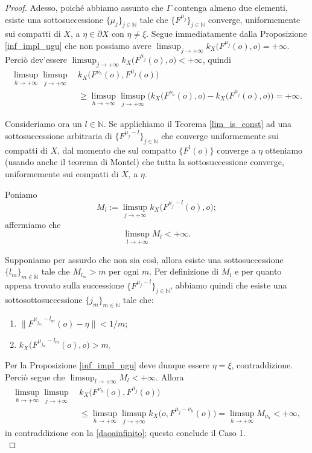 \begin{proof}
    Adesso, poiché abbiamo assunto che $\Gamma$ contenga almeno due elementi, esiste una sottosuccessione $\{\mu_j\}_{j\in\mathbb{N}}$ tale che $\{F^{\mu_j}\}_{j\in\mathbb{N}}$ converge, uniformemente sui compatti di $X$, a $\eta\in\partial X$ con $\eta\not=\xi$. Segue immediatamente dalla Proposizione \ref{inf_impl_ugu} che non possiamo avere $\displaystyle\limsup_{j\longrightarrow+\infty} k_X\big(F^{\mu_j}(o),o\big)=+\infty$. Perciò dev'essere $\displaystyle\limsup_{j\longrightarrow+\infty} k_X\big(F^{\mu_j}(o),o\big)<+\infty$, quindi
    \begin{equation} \label{daoainfinito}
        \begin{aligned}
            \limsup_{h\longrightarrow+\infty}\limsup_{j\longrightarrow+\infty}\, &k_X\big(F^{\nu_h}(o),F^{\mu_j}(o)\big) \\
            &\ge \limsup_{h\longrightarrow+\infty}\limsup_{j\longrightarrow+\infty} \Big(k_X\big(F^{\nu_h}(o),o\big)-k_X\big(F^{\mu_j}(o),o\big)\Big)=+\infty.
        \end{aligned}
    \end{equation}

    Consideriamo ora un $l\in\mathbb{N}$. Se applichiamo il Teorema \ref{lim_is_const} ad una sottosuccessione arbitraria di $\{F^{\mu_j-l}\}_{j\in\mathbb{N}}$ che converge uniformemente sui compatti di $X$, dal momento che sul compatto $\{F^l(o)\}$ converge a $\eta$ otteniamo (usando anche il teorema di Montel) che tutta la sottosuccessione converge, uniformemente sui compatti di $X$, a $\eta$.

    Poniamo
    $$M_l:=\limsup_{j\longrightarrow+\infty}k_X\big(F^{\mu_j-l}(o),o\big);$$
    affermiamo che
    $$\limsup_{l\longrightarrow+\infty}M_l<+\infty.$$

    Supponiamo per assurdo che non sia così, allora esiste una sottosuccessione $\{l_m\}_{m\in\mathbb{N}}$ tale che $M_{l_m}>m$ per ogni $m$. Per definizione di $M_l$ e per quanto appena trovato sulla successione $\{F^{\mu_j-l}\}_{j\in\mathbb{N}}$, abbiamo quindi che esiste una sottosottosuccessione $\{j_m\}_{m\in\mathbb{N}}$ tale che:
    \begin{enumerate}[label={(\arabic*)}]
        \item $\|F^{\mu_{j_m}-l_m}(o)-\eta\|<1/m$;
        \item $k_X\big(F^{\mu_{j_m}-l_m}(o),o\big)>m$.
    \end{enumerate}

    Per la Proposizione \ref{inf_impl_ugu} deve dunque essere $\eta=\xi$, contraddizione. Perciò segue che $\displaystyle\limsup_{l\longrightarrow+\infty}M_l<+\infty$. Allora
    \begin{align*}
        \limsup_{h\longrightarrow+\infty}\limsup_{j\longrightarrow+\infty}\, &k_X\big(F^{\nu_h}(o),F^{\mu_j}(o)\big) \\
        &\le \limsup_{h\longrightarrow+\infty}\limsup_{j\longrightarrow+\infty} k_X\big(o,F^{\mu_j-\nu_h}(o)\big)=\limsup_{h\longrightarrow+\infty}M_{\nu_h}<+\infty,
    \end{align*}
    in contraddizione con la \eqref{daoainfinito}; questo conclude il Caso 1.\\


\end{proof}
